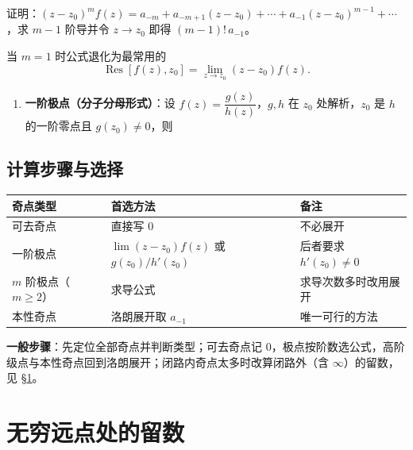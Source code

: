 
证明：\((z-z_0)^mf(z)=a_{-m}+a_{-m+1}(z-z_0)+\cdots+a_{-1}(z-z_0)^{m-1}+\cdots\)，求 \(m-1\) 阶导并令 \(z\to z_0\) 即得 \((m-1)!\,a_{-1}\)。

当 \(m=1\) 时公式退化为最常用的
\[
\operatorname{Res}[f(z),z_0]=\lim_{z\to z_0}(z-z_0)f(z).
\]

\begin{enumerate}[label=(\arabic*),start=4]
    \item \textbf{一阶极点（分子分母形式）}：设 \(f(z)=\dfrac{g(z)}{h(z)}\)，\(g,h\) 在 \(z_0\) 处解析，\(z_0\) 是 \(h\) 的一阶零点且 \(g(z_0)\neq 0\)，则
\end{enumerate}


\subsection{计算步骤与选择}

\begin{center}
\begin{tabular}{@{}lll@{}}
\toprule
奇点类型 & 首选方法 & 备注 \\
\midrule
可去奇点 & 直接写 \(0\) & 不必展开 \\
一阶极点 & \(\lim (z-z_0)f(z)\) 或 \(g(z_0)/h'(z_0)\) & 后者要求 \(h'(z_0)\neq 0\) \\
\(m\) 阶极点（\(m\ge 2\)） & 求导公式 & 求导次数多时改用展开 \\
本性奇点 & 洛朗展开取 \(a_{-1}\) & 唯一可行的方法 \\
\bottomrule
\end{tabular}
\end{center}

\textbf{一般步骤}：先定位全部奇点并判断类型；可去奇点记 \(0\)，极点按阶数选公式，高阶级点与本性奇点回到洛朗展开；闭路内奇点太多时改算闭路外（含 \(\infty\)）的留数，见 \S\ref{sec:inf-residue}。


\section{无穷远点处的留数}\label{sec:inf-residue}

